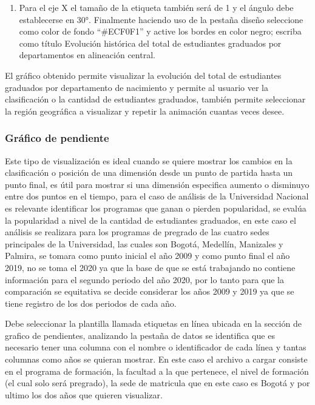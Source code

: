 \documentclass[
]{book}
\providecommand{\tightlist}{%
  \setlength{\itemsep}{0pt}\setlength{\parskip}{0pt}}
\begin{document}
\begin{enumerate}
\def\labelenumi{\arabic{enumi}.}
\setcounter{enumi}{8}
\tightlist
\item
  Para el eje X el tamaño de la etiqueta también será de 1 y el ángulo debe establecerse en 30°. Finalmente haciendo uso de la pestaña diseño seleccione como color de fondo ``\#ECF0F1'' y active los bordes en color negro; escriba como título Evolución histórica del total de estudiantes graduados por departamentos en alineación central.
\end{enumerate}

El gráfico obtenido permite visualizar la evolución del total de estudiantes graduados por departamento de nacimiento y permite al usuario ver la clasificación o la cantidad de estudiantes graduados, también permite seleccionar la región geográfica a visualizar y repetir la animación cuantas veces desee.

\hypertarget{graficopendienteflourish}{%
\subsubsection{Gráfico de pendiente}\label{graficopendienteflourish}}

Este tipo de visualización es ideal cuando se quiere mostrar los cambios en la clasificación o posición de una dimensión desde un punto de partida hasta un punto final, es útil para mostrar si una dimensión especifica aumento o disminuyo entre dos puntos en el tiempo, para el caso de análisis de la Universidad Nacional es relevante identificar los programas que ganan o pierden popularidad, se evalúa la popularidad a nivel de la cantidad de estudiantes graduados, en este caso el análisis se realizara para los programas de pregrado de las cuatro sedes principales de la Universidad, las cuales son Bogotá, Medellín, Manizales y Palmira, se tomara como punto inicial el año 2009 y como punto final el año 2019, no se toma el 2020 ya que la base de que se está trabajando no contiene información para el segundo periodo del año 2020, por lo tanto para que la comparación se equitativa se decide considerar los años 2009 y 2019 ya que se tiene registro de los dos periodos de cada año.

Debe seleccionar la plantilla llamada etiquetas en línea ubicada en la sección de grafico de pendientes, analizando la pestaña de datos se identifica que es necesario tener una columna con el nombre o identificador de cada línea y tantas columnas como años se quieran mostrar. En este caso el archivo a cargar consiste en el programa de formación, la facultad a la que pertenece, el nivel de formación (el cual solo será pregrado), la sede de matricula que en este caso es Bogotá y por ultimo los dos años que quieren visualizar.
\end{document}

